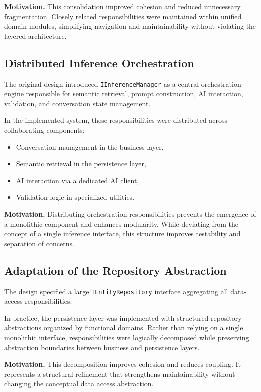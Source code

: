 \textbf{Motivation.}  
This consolidation improved cohesion and reduced unnecessary fragmentation. Closely related responsibilities were maintained within unified domain modules, simplifying navigation and maintainability without violating the layered architecture.

\subsection{Distributed Inference Orchestration}

The original design introduced \texttt{IInferenceManager} as a central orchestration engine responsible for semantic retrieval, prompt construction, AI interaction, validation, and conversation state management.

In the implemented system, these responsibilities were distributed across collaborating components:
\begin{itemize}
    \item Conversation management in the business layer,
    \item Semantic retrieval in the persistence layer,
    \item AI interaction via a dedicated AI client,
    \item Validation logic in specialized utilities.
\end{itemize}

\textbf{Motivation.}  
Distributing orchestration responsibilities prevents the emergence of a monolithic component and enhances modularity. While deviating from the concept of a single inference interface, this structure improves testability and separation of concerns.

\subsection{Adaptation of the Repository Abstraction}

The design specified a large \texttt{IEntityRepository} interface aggregating all data-access responsibilities.

In practice, the persistence layer was implemented with structured repository abstractions organized by functional domains. Rather than relying on a single monolithic interface, responsibilities were logically decomposed while preserving abstraction boundaries between business and persistence layers.

\textbf{Motivation.}  
This decomposition improves cohesion and reduces coupling. It represents a structural refinement that strengthens maintainability without changing the conceptual data access abstraction.

